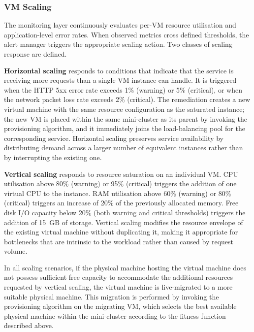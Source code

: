\documentclass[a4paper, 12pt]{report}
\begin{document}
\subsubsection{VM Scaling}
 
The monitoring layer continuously evaluates per-VM resource utilisation
and application-level error rates.  When observed metrics cross
defined thresholds, the alert manager triggers the appropriate scaling
action.  Two classes of scaling response are defined.
 
\textbf{Horizontal scaling} responds to conditions that indicate that
the service is receiving more requests than a single VM instance can
handle.  It is triggered when the HTTP 5xx error rate exceeds 1\%
(warning) or 5\% (critical), or when the network packet loss rate
exceeds 2\% (critical).  The remediation creates a new virtual machine
with the same resource configuration as the saturated instance; the new
VM is placed within the same mini-cluster as its parent by invoking the
provisioning algorithm, and it immediately joins the load-balancing pool
for the corresponding service.  Horizontal scaling preserves service
availability by distributing demand across a larger number of equivalent
instances rather than by interrupting the existing one.
 
\textbf{Vertical scaling} responds to resource saturation on an
individual VM.  CPU utilisation above 80\% (warning) or 95\% (critical)
triggers the addition of one virtual CPU to the instance.  RAM utilisation
above 60\% (warning) or 80\% (critical) triggers an increase of 20\% of
the previously allocated memory.  Free disk I/O capacity below 20\%
(both warning and critical thresholds) triggers the addition of 15~GB
of storage.  Vertical scaling modifies the resource envelope of the
existing virtual machine without duplicating it, making it appropriate
for bottlenecks that are intrinsic to the workload rather than caused
by request volume.
 
In all scaling scenarios, if the physical machine hosting the virtual
machine does not possess sufficient free capacity to accommodate the
additional resources requested by vertical scaling, the virtual machine
is live-migrated to a more suitable physical machine.  This migration
is performed by invoking the provisioning algorithm on the migrating VM,
which selects the best available physical machine within the
mini-cluster according to the fitness function described above.
 
\end{document}
